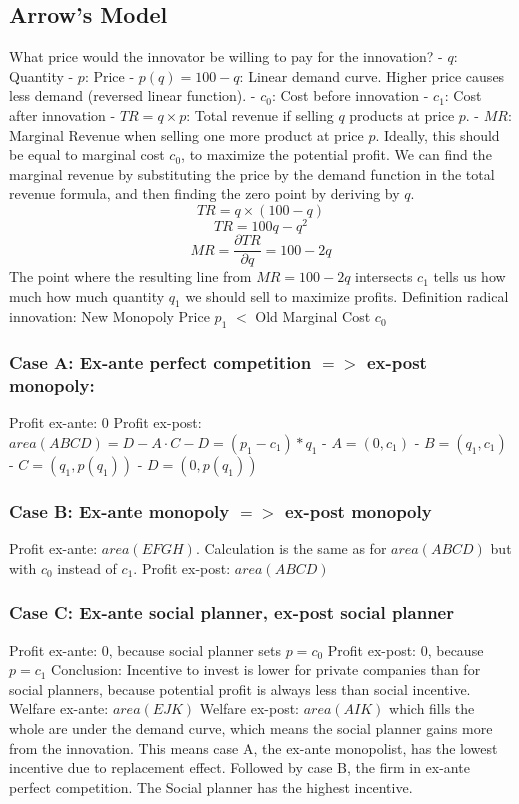 \documentclass{scrartcl}
\begin{document}
\subsection*{Arrow's Model}
What price would the innovator be willing to pay for the innovation?
- $q$: Quantity
- $p$: Price
- $p(q) = 100 - q$: Linear demand curve. Higher price causes less demand (reversed linear function).
- $c_0$: Cost before innovation
- $c_1$: Cost after innovation
- $TR = q \times p$: Total revenue if selling $q$ products at price $p$.
- $MR$: Marginal Revenue when selling one more product at price $p$. Ideally, this should be equal to marginal cost $c_0$, to maximize the potential profit. We can find the marginal revenue by substituting the price by the demand function in the total revenue formula, and then finding the zero point by deriving by $q$.
$$TR = q \times (100 - q)$$
$$TR = 100q - q^2$$
$$MR = \frac{\partial TR}{\partial q} = 100 - 2q$$
The point where the resulting line from $MR = 100 - 2q$ intersects $c_1$ tells us how much how much quantity $q_1$ we should sell to maximize profits.
Definition radical innovation:
New Monopoly Price $p_1$ $<$ Old Marginal Cost $c_0$
\subsubsection*{Case A: Ex-ante perfect competition $=>$ ex-post monopoly:}
Profit ex-ante: $0$
Profit ex-post: $area(ABCD) = D - A \cdot C - D = (p_1 - c_1) * q_1$
- $A = (0, c_1)$
- $B = (q_1, c_1)$
- $C = (q_1, p(q_1))$
- $D = (0, p(q_1))$
\subsubsection*{Case B: Ex-ante monopoly $=>$ ex-post monopoly}
Profit ex-ante: $area(EFGH)$. Calculation is the same as for $area(ABCD)$ but with $c_0$ instead of $c_1$.
Profit ex-post: $area(ABCD)$
\subsubsection*{Case C: Ex-ante social planner, ex-post social planner}
Profit ex-ante: $0$, because social planner sets $p = c_0$
Profit ex-post: $0$, because $p = c_1$
Conclusion: Incentive to invest is lower for private companies than for social planners, because potential profit is always less than social incentive.
Welfare ex-ante: $area(EJK)$
Welfare ex-post: $area(AIK)$
which fills the whole are under the demand curve, which means the social planner gains more from the innovation.
This means case A, the ex-ante monopolist, has the lowest incentive due to replacement effect. Followed by case B, the firm in ex-ante perfect competition. The Social planner has the highest incentive.
\end{document}
